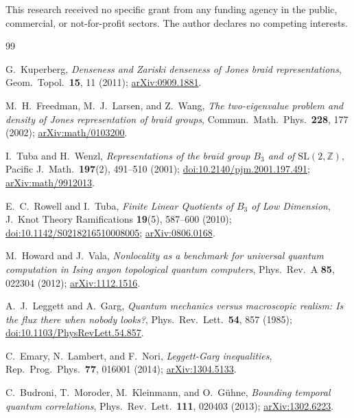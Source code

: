 \documentclass[aps,prx,reprint,amsmath,amssymb,floatfix,nofootinbib,superscriptaddress]{revtex4-2}
\begin{document}
This research received no specific grant from any funding agency in the public,
commercial, or not-for-profit sectors. The author declares no competing interests.

\begin{thebibliography}{99}

G.~Kuperberg,
\emph{Denseness and Zariski denseness of Jones braid representations},
Geom.\ Topol.\ \textbf{15}, 11 (2011);
\href{https://arxiv.org/abs/0909.1881}{arXiv:0909.1881}.

M.~H.~Freedman, M.~J.~Larsen, and Z.~Wang,
\emph{The two-eigenvalue problem and density of Jones representation of braid groups},
Commun.\ Math.\ Phys.\ \textbf{228}, 177 (2002);
\href{https://arxiv.org/abs/math/0103200}{arXiv:math/0103200}.

I.~Tuba and H.~Wenzl,
\emph{Representations of the braid group $B_3$ and of $\mathrm{SL}(2,\mathbb{Z})$},
Pacific J.\ Math.\ \textbf{197}(2), 491--510 (2001);
\href{https://doi.org/10.2140/pjm.2001.197.491}{doi:10.2140/pjm.2001.197.491};
\href{https://arxiv.org/abs/math/9912013}{arXiv:math/9912013}.

E.~C.~Rowell and I.~Tuba,
\emph{Finite Linear Quotients of $B_3$ of Low Dimension},
J.\ Knot Theory Ramifications \textbf{19}(5), 587--600 (2010);
\href{https://doi.org/10.1142/S0218216510008005}{doi:10.1142/S0218216510008005};
\href{https://arxiv.org/abs/0806.0168}{arXiv:0806.0168}.

M.~Howard and J.~Vala,
\emph{Nonlocality as a benchmark for universal quantum computation in Ising anyon topological quantum computers},
Phys.\ Rev.\ A \textbf{85}, 022304 (2012);
\href{https://arxiv.org/abs/1112.1516}{arXiv:1112.1516}.

A.~J.~Leggett and A.~Garg,
\emph{Quantum mechanics versus macroscopic realism: Is the flux there when nobody looks?},
Phys.\ Rev.\ Lett.\ \textbf{54}, 857 (1985);
\href{https://doi.org/10.1103/PhysRevLett.54.857}{doi:10.1103/PhysRevLett.54.857}.

C.~Emary, N.~Lambert, and F.~Nori,
\emph{Leggett-Garg inequalities},
Rep.\ Prog.\ Phys.\ \textbf{77}, 016001 (2014);
\href{https://arxiv.org/abs/1304.5133}{arXiv:1304.5133}.

C.~Budroni, T.~Moroder, M.~Kleinmann, and O.~G\"uhne,
\emph{Bounding temporal quantum correlations},
Phys.\ Rev.\ Lett.\ \textbf{111}, 020403 (2013);
\href{https://arxiv.org/abs/1302.6223}{arXiv:1302.6223}.


\end{thebibliography}
\end{document}
